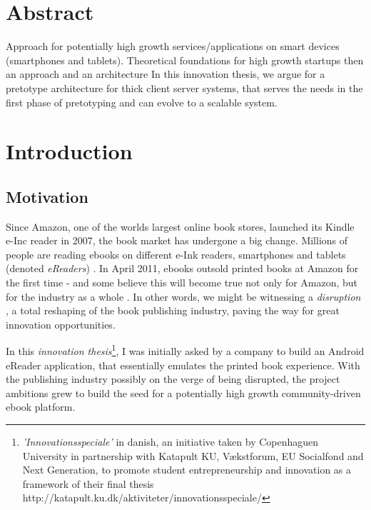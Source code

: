 \documentclass[a4paper,10pt]{book}
\begin{document}
\section{Abstract}
Approach for potentially high growth services/applications on smart devices (smartphones and tablets).
Theoretical foundations for high growth startups then an approach and an architecture 
In this innovation thesis, we argue for a pretotype architecture for thick client server systems, 
that serves the needs in the first phase of pretotyping and can evolve to a scalable system.


\tableofcontents

\newpage

\section{Introduction}

\subsection{Motivation}
Since Amazon, one of the worlds largest online book stores, launched its Kindle e-Inc reader in 2007, the book market has undergone a big change. 
Millions of people are reading ebooks on different e-Ink readers, smartphones and tablets (denoted \emph{eReaders}) \cite{1}\cite{2}\cite{3}\cite{4}\cite{adultEbookSecondLargestBookFormat}.
In April 2011, ebooks outsold printed books at Amazon for the first time \cite{amazonEbookSurpassedPrint} - and some 
believe this will become true not only for Amazon, 
but for the industry as a whole \cite{barnesEbookPassPrint}\cite{halfPreditEbookDominant2014}.
In other words, we might be witnessing a \emph{disruption} \cite{amazonDisruptionUnforldingTimothy}\cite{amazonVsSonyReaderDisrupting}, a total reshaping of the book publishing industry, 
paving the way for great innovation opportunities. 


In this \emph{innovation thesis}\footnote{\emph{'Innovationsspeciale'} in danish, an initiative taken by Copenhaguen University
	in partnership with Katapult KU, Vækstforum, EU Socialfond and Next Generation, to promote student entrepreneurship and 
	innovation as a framework of their final thesis http://katapult.ku.dk/aktiviteter/innovationsspeciale/}, 
I was initially asked by a company to build an Android eReader application, that essentially emulates the printed book experience. 
With the publishing industry possibly on the verge of being disrupted, 
the project ambitions grew to build the seed for a potentially high growth community-driven ebook platform.
\end{document}
